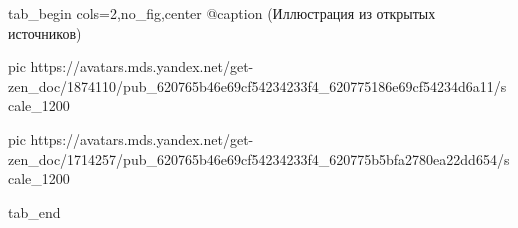  
 
 
 
 


\ifcmt
  tab_begin cols=2,no_fig,center
		 @caption (Иллюстрация из открытых источников)

     pic https://avatars.mds.yandex.net/get-zen_doc/1874110/pub_620765b46e69cf54234233f4_620775186e69cf54234d6a11/scale_1200

		 pic https://avatars.mds.yandex.net/get-zen_doc/1714257/pub_620765b46e69cf54234233f4_620775b5bfa2780ea22dd654/scale_1200

  tab_end
\fi

